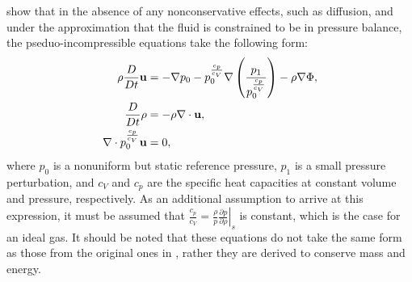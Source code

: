 \citet{Vasil2013} show that in the absence of any nonconservative effects, such as diffusion, and under the approximation that the fluid is constrained to be in pressure balance, the pseduo-incompressible equations take the following form:
\begin{subequations}
	\begin{align}
		\rho\frac{D}{Dt}\mathbf{u}&=-\nabla p_{0}-p_{0}^{\frac{c_{p}}{c_{V}}}\nabla\left(\frac{p_{1}}{p_{0}^{\frac{c_{p}}{c_{V}}}}\right)-\rho\nabla\Phi,\\
		\frac{D}{Dt}\rho&=-\rho\nabla\cdot\mathbf{u},\\
		\nabla\cdot p_{0}^{\frac{c_{p}}{c_{V}}}\mathbf{u}&=0,
	\end{align}
\end{subequations}
where $p_{0}$ is a nonuniform but static reference pressure, $p_{1}$ is a small pressure perturbation, and $c_{V}$ and $c_{p}$ are the specific heat capacities at constant volume and pressure, respectively.
As an additional assumption to arrive at this expression, it must be assumed that $\frac{c_{p}}{c_{V}}=\frac{\rho}{p}\left.\frac{\partial p}{\partial \rho}\right|_{s}$ is constant, which is the case for an ideal gas.
It should be noted that these equations do not take the same form as those from the original ones in \citet{Durran1989}, rather they are derived to conserve mass and energy.


